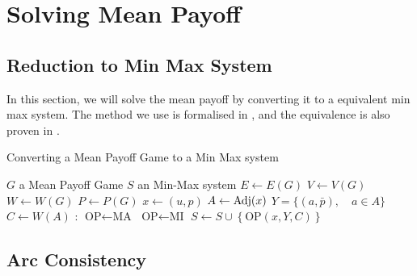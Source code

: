 \section{Solving Mean Payoff}
\subsection{Reduction to Min Max System}
In this section, we will solve the mean payoff by converting it to a equivalent min max system.
\newline The method we use is formalised in \cite{MPGMaxAtom}, and the equivalence is also proven in \cite{MPGMaxAtom}.
\begin{algorithm}
	\caption{Converting a Mean Payoff Game to a Min Max system}\label{alg:MPGToMinMax}
	\begin{algorithmic}
		\Require $G$ a Mean Payoff Game
		\Ensure $S$ an Min-Max system 
		\State $E\leftarrow E(G)$ 
		\State $V\leftarrow V(G)$
		\State $W \leftarrow W(G)$ 
		\State $P \leftarrow P(G)$ 
			\State $x\leftarrow (u,p)$
			\State $A\leftarrow \operatorname{Adj}(x)$
			\State $Y=\{(a,\bar{p}),\quad a\in A\}$
			\State $C\leftarrow W(A)$ 
			:
				\State $\text{OP}\leftarrow \text{MA}$			
			\Else
				\State $\text{OP}\leftarrow \text{MI}$	
			\EndIf
			\State $S\leftarrow S\cup \left\{\text{OP}(x,Y,C)\right\}$
		\EndFor
	\end{algorithmic}
\end{algorithm}
\subsection{Arc Consistency}
